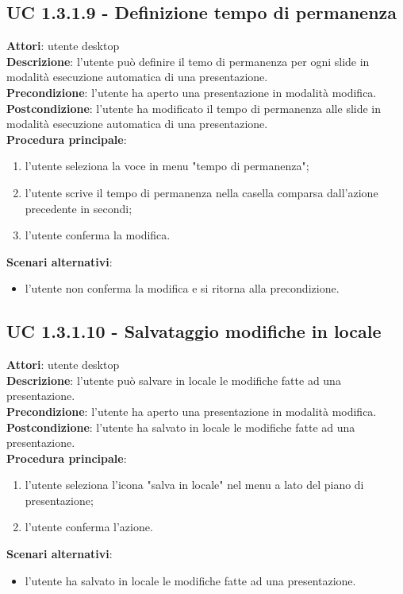 \subsection{UC 1.3.1.9 - Definizione tempo di permanenza}{
	\label{uc1.3.1.9}
	\textbf{Attori}: utente desktop \\
	\textbf{Descrizione}: l'utente può definire il temo di permanenza per ogni slide in modalità esecuzione automatica di una presentazione. \\
	\textbf{Precondizione}: l'utente ha aperto una presentazione in modalità modifica.	\\
	\textbf{Postcondizione}: l'utente ha modificato il tempo di permanenza alle slide in modalità esecuzione automatica di una presentazione.	\\
	\textbf{Procedura principale}:
	\begin{enumerate}
		\item l'utente seleziona la voce in menu "tempo di permanenza";
		\item l'utente scrive il tempo di permanenza nella casella comparsa dall'azione precedente in secondi;
		\item l'utente conferma la modifica.
	\end{enumerate}
	\textbf{Scenari alternativi}:
	\begin{itemize}
		\item l'utente non conferma la modifica  e si ritorna alla precondizione.
	\end{itemize}
}
\subsection{UC 1.3.1.10 - Salvataggio modifiche in locale}{
	\label{uc1.3.1.10}
	\textbf{Attori}: utente desktop \\
	\textbf{Descrizione}: l'utente può salvare in locale le modifiche fatte ad una presentazione. \\
	\textbf{Precondizione}: l'utente ha aperto una presentazione in modalità modifica.	\\
	\textbf{Postcondizione}: l'utente ha salvato in locale le modifiche fatte ad una presentazione.	\\
	\textbf{Procedura principale}:
	\begin{enumerate}
		\item l'utente seleziona l'icona "salva in locale" nel menu a lato del piano di presentazione;
		\item l'utente conferma l'azione.
	\end{enumerate}
	\textbf{Scenari alternativi}:
	\begin{itemize}
		\item l'utente ha salvato in locale le modifiche fatte ad una presentazione.
	\end{itemize}
}
